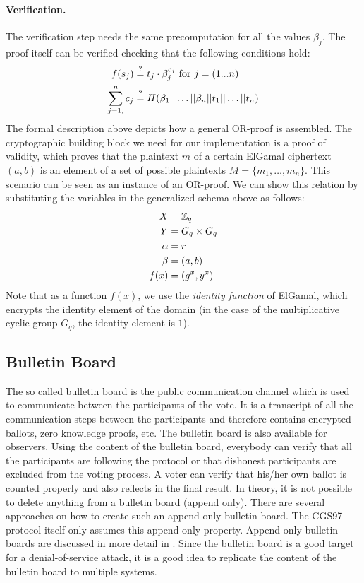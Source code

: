 \documentclass[numbers=noenddot, abstract=on, a4paper, headsepline,
footsepline, oneside, draft=off]{scrreprt}
\begin{document}
\paragraph{Verification.} The verification step needs the same precomputation
for all the values $\beta_j$. The proof itself can be verified checking that
the following conditions hold:
\begin{align}
	f(s_j) &\stackrel{?}{=} t_j \cdot \beta_j^{c_j} \text{ for } j=(1...n)
	\notag \\
	 \sum_{j=1,}^n c_j &\stackrel{?}{=}
	 H(\beta_1||\ldots||\beta_n||t_1||\ldots||t_n)
	 \notag
\end{align}
The formal description above depicts how a general OR-proof is assembled. The
cryptographic building block we need for our implementation is a proof of
validity, which proves that the plaintext $m$ of a certain ElGamal ciphertext
$(a, b)$ is an element of a set of possible plaintexts $M=\{m_1, \ldots, m_n\}$. This
scenario can be seen as an instance of an OR-proof. We can show this relation by
substituting the variables in the generalized schema above as follows:
\begin{align}
  X &= \mathbb{Z}_q \notag \\
  Y &= G_q \times G_q \notag \\
  \alpha &=r \notag \\
  \beta &=(a, b) \notag \\
  f(x) &= (g^x, y^x) \notag
\end{align} 
Note that as a function $f(x)$, we use the \emph{identity function} of ElGamal,
which encrypts the identity element of the domain (in the case of the
multiplicative cyclic group $G_q$, the identity element is $1$).

\subsection{Bulletin Board}
\label{sec:bulletinboard}
The so called bulletin board is the public communication channel which is used
to communicate between the participants of the vote. It is a
transcript of all the communication steps between the participants and therefore
contains encrypted ballots, zero knowledge proofs, etc. The bulletin board is
also available for observers. Using the content of the bulletin board, everybody
can verify that all the participants are following the protocol or that
dishonest participants are excluded from the voting process. A voter can verify
that his/her own ballot is counted properly and also reflects in the final
result. In theory, it is not possible to delete anything from a bulletin board
(append only). There are several approaches on how to create such an
append-only bulletin board. The CGS97 protocol itself only assumes this
append-only property. Append-only bulletin boards are discussed in more detail
in \cite{HL09}. Since the bulletin board is a good target for a
denial-of-service attack, it is a good idea to replicate the content of the bulletin board to multiple systems.
\end{document}
